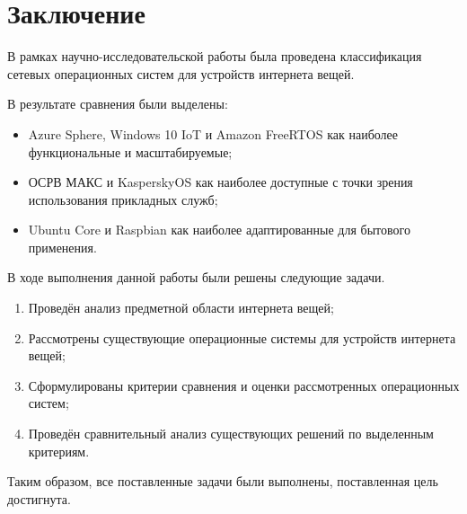 \section*{Заключение}

В рамках научно-исследовательской работы была проведена классификация сетевых операционных систем для устройств интернета вещей.

В результате сравнения были выделены: 

\begin{itemize}
	\item Azure Sphere, Windows 10 IoT и Amazon FreeRTOS как наиболее функциональные и масштабируемые;
	\item ОСРВ МАКС и KasperskyOS как наиболее доступные с точки зрения использования прикладных служб;
	\item Ubuntu Core и Raspbian как наиболее адаптированные для бытового применения.
\end{itemize}

В ходе выполнения данной работы были решены следующие задачи.

\begin{enumerate}[label*=\arabic*.]
\item Проведён анализ предметной области интернета вещей;
\item Рассмотрены существующие операционные системы для устройств интернета вещей;
\item Сформулированы критерии сравнения и оценки рассмотренных операционных систем;
\item Проведён сравнительный анализ существующих решений по выделенным критериям. 
\end{enumerate}

Таким образом, все поставленные задачи были выполнены, поставленная цель достигнута.

\pagebreak
